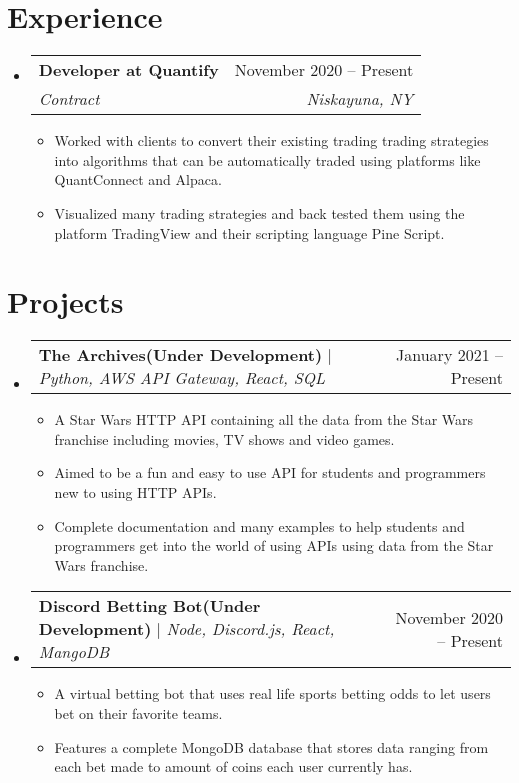 \documentclass[letterpaper,11pt]{article}
\makeatletter
\newcommand{\resumeItem}[1]{
  \item\small{
    {#1 \vspace{-2pt}}
  }
}
\newcommand{\resumeSubheading}[4]{
  \vspace{-2pt}\item
    \begin{tabular*}{0.97\textwidth}[t]{l@{\extracolsep{\fill}}r}
      \textbf{#1} & #2 \\
      \textit{\small#3} & \textit{\small #4} \\
    \end{tabular*}\vspace{-7pt}
}
\newcommand{\resumeSubSubheading}[2]{
    \item
    \begin{tabular*}{0.97\textwidth}{l@{\extracolsep{\fill}}r}
      \textit{\small#1} & \textit{\small #2} \\
    \end{tabular*}\vspace{-7pt}
}
\newcommand{\resumeProjectHeading}[2]{
    \item
    \begin{tabular*}{0.97\textwidth}{l@{\extracolsep{\fill}}r}
      \small#1 & #2 \\
    \end{tabular*}\vspace{-7pt}
}
\newcommand{\resumeSubHeadingListStart}{\begin{itemize}[leftmargin=0.15in, label={}]}
\newcommand{\resumeSubHeadingListEnd}{\end{itemize}}
\newcommand{\resumeItemListStart}{\begin{itemize}}
\newcommand{\resumeItemListEnd}{\end{itemize}\vspace{-5pt}}
\makeatother
\begin{document}
\section{Experience}
  \resumeSubHeadingListStart

    \resumeSubheading
      {Developer at Quantify }{November 2020 -- Present}
      {Contract}{Niskayuna, NY}
      \resumeItemListStart
        \resumeItem{Worked with clients to convert their existing trading trading strategies into algorithms that can be automatically traded using platforms like QuantConnect and Alpaca.}
        \resumeItem{Visualized many trading strategies and back tested them using the platform TradingView and their scripting language Pine Script.}
      \resumeItemListEnd
      

  \resumeSubHeadingListEnd


\section{Projects}
    \resumeSubHeadingListStart
      \resumeProjectHeading
          {\textbf{The Archives(Under Development)} $|$ \emph{Python, AWS API Gateway, React, SQL}}{January 2021 -- Present}
          \resumeItemListStart
            \resumeItem{A Star Wars HTTP API containing all the data from the Star Wars franchise including movies, TV shows and video games.}
            \resumeItem{Aimed to be a fun and easy to use API for students and programmers new to using HTTP APIs.}
            \resumeItem{Complete documentation and many examples to help students and programmers get into the world of using APIs using data from the Star Wars franchise.}
          \resumeItemListEnd
      \resumeProjectHeading
          {\textbf{Discord Betting Bot(Under Development)} $|$ \emph{Node, Discord.js, React, MangoDB}}{November 2020 -- Present}
          \resumeItemListStart
            \resumeItem{A virtual betting bot that uses real life sports betting odds to let users bet on their favorite teams.}
            \resumeItem{Features a complete MongoDB database that stores data ranging from each bet made to amount of coins each user currently has.}
          \resumeItemListEnd
    \resumeSubHeadingListEnd
\end{document}

